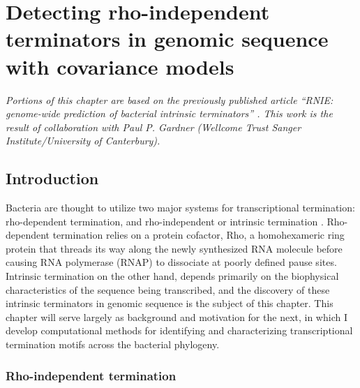 
\chapter{Detecting rho-independent terminators in genomic sequence with covariance models}
\label{sec:chapterPingpong}
\ifpdf
    \graphicspath{{Chapter4/Chapter4Figs/EPS/}{Chapter4/Chapter4Figs/}}
\fi

\textit{Portions of this chapter are based on the previously published article ``RNIE: genome-wide prediction of bacterial intrinsic terminators'' \parencite{Gardner2011a}. This work is the result of collaboration with Paul P. Gardner (Wellcome Trust Sanger Institute/University of Canterbury). }

\section{Introduction}

Bacteria are thought to utilize two major systems for transcriptional termination: rho-dependent termination, and rho-independent or intrinsic termination \parencite{Peters2011}. Rho-dependent termination relies on a protein cofactor, Rho, a homohexameric ring protein that threads its way along the newly synthesized RNA molecule before causing RNA polymerase (RNAP) to dissociate at poorly defined pause sites. Intrinsic termination on the other hand, depends primarily on the biophysical characteristics of the sequence being transcribed, and the discovery of these intrinsic terminators in genomic sequence is the subject of this chapter. This chapter will serve largely as background and motivation for the next, in which I develop computational methods for identifying and characterizing transcriptional termination motifs across the bacterial phylogeny.

\subsection{Rho-independent termination}

